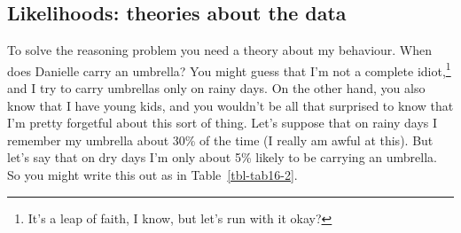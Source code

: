 \documentclass[
  a4paper,
]{book}
\begin{document}
\hypertarget{likelihoods-theories-about-the-data}{%
\subsection{Likelihoods: theories about the
data}\label{likelihoods-theories-about-the-data}}

To solve the reasoning problem you need a theory about my behaviour.
When does Danielle carry an umbrella? You might guess that I'm not a
complete idiot,\footnote{It's a leap of faith, I know, but let's run
  with it okay?} and I try to carry umbrellas only on rainy days. On the
other hand, you also know that I have young kids, and you wouldn't be
all that surprised to know that I'm pretty forgetful about this sort of
thing. Let's suppose that on rainy days I remember my umbrella about
30\% of the time (I really am awful at this). But let's say that on dry
days I'm only about 5\% likely to be carrying an umbrella. So you might
write this out as in Table~\ref{tbl-tab16-2}.

\hypertarget{tbl-tab16-2}{}
 
  \providecommand{\huxb}[2]{\arrayrulecolor[RGB]{#1}\global\arrayrulewidth=#2pt}
  \providecommand{\huxvb}[2]{\color[RGB]{#1}\vrule width #2pt}
  \providecommand{\huxtpad}[1]{\rule{0pt}{#1}}
  \providecommand{\huxbpad}[1]{\rule[-#1]{0pt}{#1}}
\end{document}
